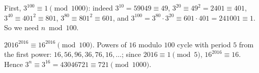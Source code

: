 First, $3^{100}\equiv1\pmod{1000}$: indeed $3^{10}=59049\equiv49$, $3^{20}\equiv49^2=2401\equiv401$, $3^{40}\equiv401^2\equiv801$, $3^{80}\equiv801^2\equiv601$, and $3^{100}=3^{80}\cdot3^{20}\equiv601\cdot401=241001\equiv1$. So we need $n\bmod100$.

$2016^{2016}\equiv16^{2016}\pmod{100}$. Powers of $16$ modulo $100$ cycle with period $5$ from the first power: $16,56,96,36,76,16,\dots$; since $2016\equiv1\pmod5$, $16^{2016}\equiv16$. Hence $3^n\equiv3^{16}=43046721\equiv\boxed{721}\pmod{1000}$.
